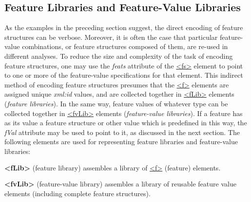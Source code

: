 \subsection[{Feature Libraries and Feature-Value Libraries}]{Feature Libraries and Feature-Value Libraries}\label{FSFL}\par
As the examples in the preceding section suggest, the direct encoding of feature structures can be verbose. Moreover, it is often the case that particular feature-value combinations, or feature structures composed of them, are re-used in different analyses. To reduce the size and complexity of the task of encoding feature structures, one may use the {\itshape feats} attribute of the \hyperref[TEI.fs]{<fs>} element to point to one or more of the feature-value specifications for that element. This indirect method of encoding feature structures presumes that the \hyperref[TEI.f]{<f>} elements are assigned unique {\itshape xml:id} values, and are collected together in \hyperref[TEI.fLib]{<fLib>} elements (\textit{feature libraries}). In the same way, feature values of whatever type can be collected together in \hyperref[TEI.fvLib]{<fvLib>} elements (\textit{feature-value libraries}). If a feature has as its value a feature structure or other value which is predefined in this way, the {\itshape fVal} attribute may be used to point to it, as discussed in the next section. The following elements are used for representing feature libraries and feature-value libraries: 
\begin{sansreflist}
  
\item [\textbf{<fLib>}] (feature library) assembles a library of \hyperref[TEI.f]{<f>} (feature) elements.
\item [\textbf{<fvLib>}] (feature-value library) assembles a library of reusable feature value elements (including complete feature structures).
\end{sansreflist}
\par
